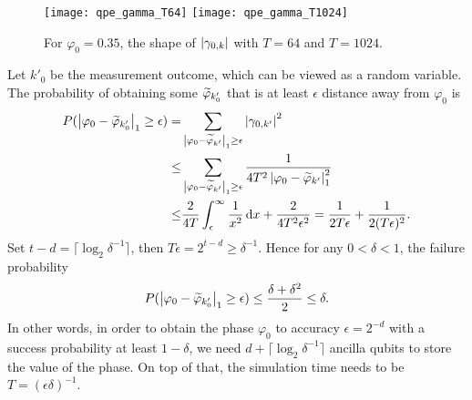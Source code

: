 \begin{figure}[H]
\begin{center}
\texttt{[image: qpe\_gamma\_T64]}
\texttt{[image: qpe\_gamma\_T1024]}
\end{center}
\caption{For $\varphi_0=0.35$, the shape of $\left\lvert\gamma_{0,k}\right\rvert$ with $T=64$ and $T=1024$.}
\label{fig:qpe_gamma}
\end{figure}

Let $k'_0$ be the measurement outcome, which can be viewed as a random variable. The probability of obtaining some $\widetilde{\varphi}_{k'_0}$ that is at least $\epsilon$ distance away from $\varphi_0$ is
\begin{equation}
\begin{split}
P(\left\lvert\varphi_0-\widetilde{\varphi}_{k'_0}\right\rvert_1\ge \epsilon)=&\sum_{\left\lvert\varphi_0-\widetilde{\varphi}_{k'}\right\rvert_1\ge \epsilon} \left\lvert\gamma_{0,k'}\right\rvert^2\\
\le &\sum_{\left\lvert\varphi_0-\widetilde{\varphi}_{k'}\right\rvert_1\ge \epsilon}\frac{1}{4T^2 \left\lvert\varphi_{0} - \widetilde{\varphi}_{k'}\right\rvert^2_1}\\
\le &\frac{2}{4T} \int_{\epsilon}^{\infty} \frac{1}{x^2}\,\mathrm{d} x + \frac{2}{4T^2 \epsilon^2}=\frac{1}{2T\epsilon}+\frac{1}{2(T\epsilon)^2}.
\end{split}
\end{equation}
Set $t-d=\lceil\log_2 \delta^{-1}\rceil$, then $T\epsilon=2^{t-d}\ge \delta^{-1}$.
Hence for any $0<\delta<1$, the failure probability
\begin{equation}
P(\left\lvert\varphi_0-\widetilde{\varphi}_{k'_0}\right\rvert_1\ge \epsilon)\le \frac{\delta+\delta^2}{2}\le \delta.
\end{equation}
In other words, in order to obtain the phase $\varphi_0$ to accuracy $\epsilon=2^{-d}$ with a success probability at least $1-\delta$, we need $d+\lceil\log_2 \delta^{-1}\rceil$ ancilla qubits to store the value of the phase.
On top of that, the simulation time needs to be $T=(\epsilon\delta)^{-1}$.



